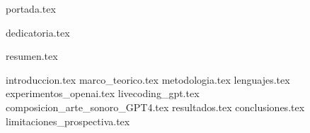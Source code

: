 
\renewcommand{\BOthers}[1]{et al.\hbox{}} %
\renewcommand{\BOthersPeriod}[1]{et al.\hbox{}}
\renewcommand{\BMTh}{Trabajo de fin de máster}
\renewcommand{\BAvailFrom}{Disponible en\ }
\renewcommand{\BRetrieved}[1]{Recuperado {#1}, de\ }
\renewcommand{\BRetrievedFrom}{Disponible en\ }
\renewcommand{\BCBL}{} %



  {portada.tex}
  \setcounter{page}{2} %


  \clearpage

  \thispagestyle{empty} 
  {dedicatoria.tex}
  \clearpage
  \thispagestyle{empty} 
  
  \pagestyle{fancy} 

  {resumen.tex}
  \clearpage
  

  \tableofcontents
  \clearpage

  \listoffigures 
  \clearpage

  \listoftables
  \clearpage

  \label{chap:glosario}
  \printglossary[title=Índice de acrónimos, toctitle=Índice de acrónimos]
  \clearpage

  \setcounter{inicioContenido}{\value{page}}

  {introduccion.tex}
  {marco_teorico.tex}
  {metodologia.tex}
  {lenguajes.tex}
  {experimentos_openai.tex}
  {livecoding_gpt.tex}
  {composicion_arte_sonoro_GPT4.tex}
  {resultados.tex}
  {conclusiones.tex}
  {limitaciones_prospectiva.tex}

